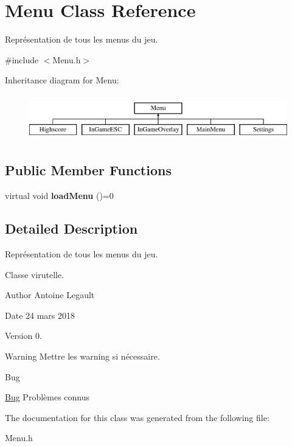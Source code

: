 \hypertarget{class_menu}{}\section{Menu Class Reference}
\label{class_menu}


Représentation de tous les menus du jeu.  




{\ttfamily \#include $<$Menu.\+h$>$}

Inheritance diagram for Menu\+:\begin{figure}[H]
\begin{center}
\leavevmode
\includegraphics[height=2.000000cm]{class_menu}
\end{center}
\end{figure}
\subsection*{Public Member Functions}
\begin{DoxyCompactItemize}
\item 
\hypertarget{class_menu_a1a9f35b14f5770063f9f935c867a4a48}{}virtual void {\bfseries load\+Menu} ()=0\label{class_menu_a1a9f35b14f5770063f9f935c867a4a48}

\end{DoxyCompactItemize}


\subsection{Detailed Description}
Représentation de tous les menus du jeu. 

Classe virutelle. \begin{DoxyAuthor}{Author}
Antoine Legault 
\end{DoxyAuthor}
\begin{DoxyDate}{Date}
24 mars 2018 
\end{DoxyDate}
\begin{DoxyVersion}{Version}
0. 
\end{DoxyVersion}
\begin{DoxyWarning}{Warning}
Mettre les warning si nécessaire. 
\end{DoxyWarning}
\begin{DoxyRefDesc}{Bug}
\item[\hyperlink{bug__bug000008}{Bug}]Problèmes connus \end{DoxyRefDesc}


The documentation for this class was generated from the following file\+:\begin{DoxyCompactItemize}
\item 
Menu.\+h\end{DoxyCompactItemize}
